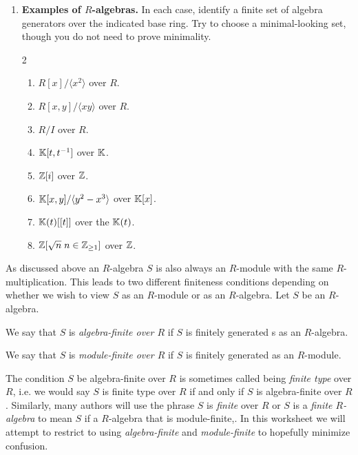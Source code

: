 \documentclass[12pt,reqno]{amsart}
\begin{document}
\begin{enumerate}[leftmargin=*, series=problems]
\item \textbf{Examples of $R$-algebras.} In each case, identify a finite set of algebra generators over the indicated base ring. Try to choose a minimal-looking set, though you do not need to prove minimality.
\begin{multicols}{2}
\begin{enumerate}
    \item $R[x]/\langle x^2\rangle$ over $R$.
    \item $R[x,y]/\langle xy\rangle$ over $R$.
    \item $R/I$ over $R$.
    \item $\mathbb{K}[t,t^{-1}]$ over $\mathbb{K}$.
    \item $\mathbb{Z}[i]$ over $\mathbb{Z}$.
    \item $\mathbb{K}[x,y]/\langle y^2-x^3\rangle$ over $\mathbb{K}[x]$.
    \item $\mathbb{K}(t)[[t]]$ over the $\mathbb{K}(t)$.
    \item $\mathbb{Z}[\sqrt{n} \; n \in \mathbb{Z}_{\geq1}]$ over $\mathbb{Z}$. 
\end{enumerate}
\end{multicols}

\end{enumerate}

\hrulefill

As discussed above an $R$-algebra $S$ is also always an $R$-module with the same $R$-multiplication. This leads to two different finiteness conditions depending on whether we wish to view $S$ as an $R$-module or as an $R$-algebra. Let $S$ be an $R$-algebra.

\begin{definition}
   We say that $S$ is \emph{algebra-finite over $R$} if $S$ is finitely generated s as an $R$-algebra.
\end{definition}

\begin{definition}
	We say that $S$ is \emph{module-finite over $R$} if $S$ is finitely generated as an $R$-module.
\end{definition}

The condition $S$ be algebra-finite over $R$ is sometimes called being \emph{finite type} over $R$, i.e. we would say $S$ is finite type over $R$ if and only if $S$ is algebra-finite over $R$. Similarly, many authors will use the phrase $S$ is \emph{finite} over $R$ or $S$ is a \emph{finite $R$-algebra} to mean $S$ if a $R$-algebra that is module-finite,. In this worksheet we will attempt to restrict to using \emph{algebra-finite} and \emph{module-finite} to hopefully minimize confusion.
\end{document}
